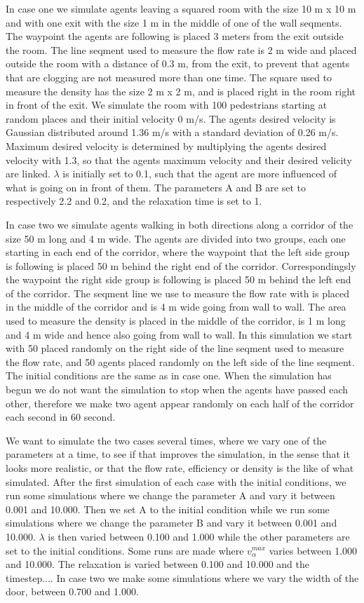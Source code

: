 In case one we simulate agents leaving a squared room with the size 10 m x 10 m and with one exit with the size 1 m in the middle of
one of the wall seqments. The waypoint the agents are following is placed 3 meters from the exit outside the room.
The line seqment used to measure the flow rate is 2 m wide and placed outside the room with a distance of 0.3 m,
from the exit, to prevent that agents that are clogging are not measured more than one time.
The square used to measure the density has the size 2 m x 2 m, and is placed right in the room right in front of the exit.
We simulate the room with 100 pedestrians starting at random places and their initial velocity 0 m/s.
The agents desired velocity is Gaussian distributed around 1.36 m/s with a standard deviation of 0.26 m/s.
Maximum desired velocity is determined by multiplying the agents desired velocity with 1.3, so that the agents
maximum velocity and their desired velicity are linked.
$\lambda$ is initially set to 0.1, such that the agent are more influenced of what is going on in front of them.
The parameters A and B are set to respectively 2.2 and 0.2, and the relaxation time is set to 1.

In case two we simulate agents walking in both directions along a corridor of the size 50 m long and 4 m wide.
The agents are divided into two groups, each one starting in each end of the corridor, where the waypoint that the
left side group is following is placed 50 m behind the right end of the corridor. Correspondingsly the waypoint
the right side group is following is placed 50 m behind the left end of the corridor.
The seqment line we use to measure the flow rate with is placed in the middle of the corridor and is 4 m wide going from wall to wall.
The area used to measure the density is placed in the middle of the corridor, is 1 m long and 4 m wide and hence
also going from wall to wall.
In this simulation we start with 50 placed randomly on the right side of the line seqment used to measure the flow rate,
and 50 agents placed randomly on the left side of the line seqment.
The initial conditions are the same as in case one.
When the simulation has begun we do not want the simulation to stop when the agents have passed each other, therefore we
make two agent appear randomly on each half of the corridor each second in 60 second.

We want to simulate the two cases several times, where we vary one of the parameters at a time, to see if that improves the simulation,
in the sense that it looks more realistic, or that the flow rate, efficiency or density is the like of what \cite{self-org} simulated.
After the first simulation of each case with the initial conditions, we run some simulations where we change the parameter A and vary
it between 0.001 and 10.000.
Then we set A to the initial condition while we run some simulations where we change the parameter B and vary it between 0.001 and 10.000.
$\lambda$ is then varied between 0.100 and 1.000 while the other parameters are set to the initial conditions.
Some runs are made where $v^{max}_{\alpha}$ varies between 1.000 and 10.000.
The relaxation is varied between 0.100 and 10.000 and the timestep....
In case two we make some simulations where we vary the width of the door, between 0.700 and 1.000.
